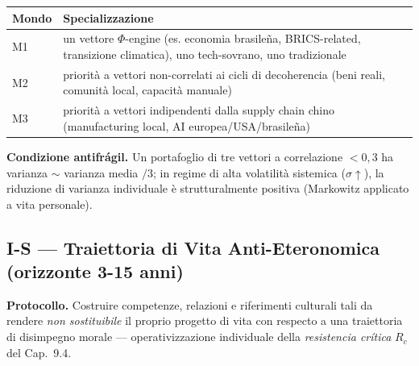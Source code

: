 {\def\LTcaptype{none} %
{\small\begin{longtable}[]{@{}
  >{\raggedright\arraybackslash}p{}
  >{\raggedright\arraybackslash}p{}@{}}
\toprule\noalign{}
\begin{minipage}[b]{\linewidth}\raggedright
Mondo
\end{minipage} & \begin{minipage}[b]{\linewidth}\raggedright
Specializzazione
\end{minipage} \\
\midrule\noalign{}
\endhead
\bottomrule\noalign{}
\endlastfoot
M1 & un vettore \(\Phi\)-engine (es. economia brasileña, BRICS-related,
transizione climatica), uno tech-sovrano, uno tradizionale \\
M2 & priorità a vettori non-correlati ai cicli di decoherencia (beni
reali, comunità local, capacità manuale) \\
M3 & priorità a vettori indipendenti dalla supply chain chino
(manufacturing local, AI europea/USA/brasileña) \\
\end{longtable}}
}

\Proved{} \textbf{Condizione antifrágil.} Un portafoglio di tre vettori
a correlazione \(< 0{,}3\) ha varianza \(\sim\) varianza media \(/ 3\);
in regime di alta volatilità sistemica (\(\sigma \uparrow\)), la
riduzione di varianza individuale è strutturalmente positiva (Markowitz
applicato a vita personale).

\subsection{I-S --- Traiettoria di Vita Anti-Eteronomica (orizzonte 3-15
anni)}\label{i-s-traiettoria-di-vita-anti-eteronomica-orizzonte-3-15-anni}

\Hypoth{} \textbf{Protocollo.} Costruire competenze, relazioni e
riferimenti culturali tali da rendere \emph{non sostituibile} il proprio
progetto di vita con respecto a una traiettoria di disimpegno morale ---
operativizzazione individuale della \emph{resistencia crítica} \(R_c\)
del Cap.~9.4.

